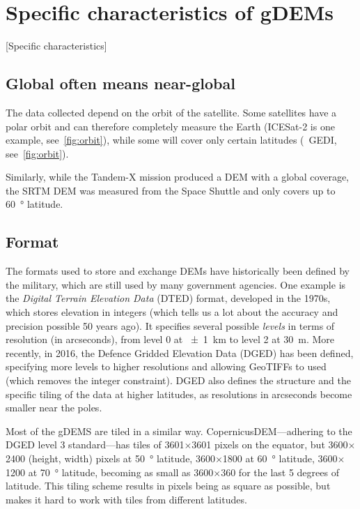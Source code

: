%
\section{Specific characteristics of gDEMs}[Specific characteristics]

\subsection{Global often means near-global}

The data collected depend on the orbit of the satellite.
Some satellites have a polar orbit and can therefore completely measure the Earth (ICESat-2 is one example, see~\ref{fig:orbit}), while some will cover only certain latitudes (\eg\ GEDI, see~\ref{fig:orbit}).

Similarly, while the Tandem-X mission produced a DEM with a global coverage, the SRTM DEM was measured from the Space Shuttle and only covers up to \qty{60}{\degree} latitude.

\subsection{Format}

The formats used to store and exchange DEMs have historically been defined by the military, which are still used by many government agencies.
One example is the \emph{Digital Terrain Elevation Data} (DTED) format, developed in the 1970s, which stores elevation in integers (which tells us a lot about the accuracy and precision possible 50 years ago).
It specifies several possible \emph{levels} in terms of resolution (in arcseconds), from level 0 at \qty{\pm1}{km} to level 2 at \qty{30}{m}.
More recently, in 2016, the Defence Gridded Elevation Data (DGED) has been defined, specifying more levels to higher resolutions and allowing GeoTIFFs to used (which removes the integer constraint).
DGED also defines the structure and the specific tiling of the data at higher latitudes, as resolutions in arcseconds become smaller near the poles.

%
Most of the gDEMS are tiled in a similar way.
CopernicusDEM---adhering to the DGED level 3 standard---has tiles of 3601$\times$3601 pixels on the equator, but 3600$\times$2400 (height, width) pixels at \qty{50}{\degree} latitude, 3600$\times$1800 at \qty{60}{\degree} latitude, 3600$\times$1200 at \qty{70}{\degree} latitude, becoming as small as 3600$\times$360 for the last 5 degrees of latitude.
This tiling scheme results in pixels being as square as possible, but makes it hard to work with tiles from different latitudes.

